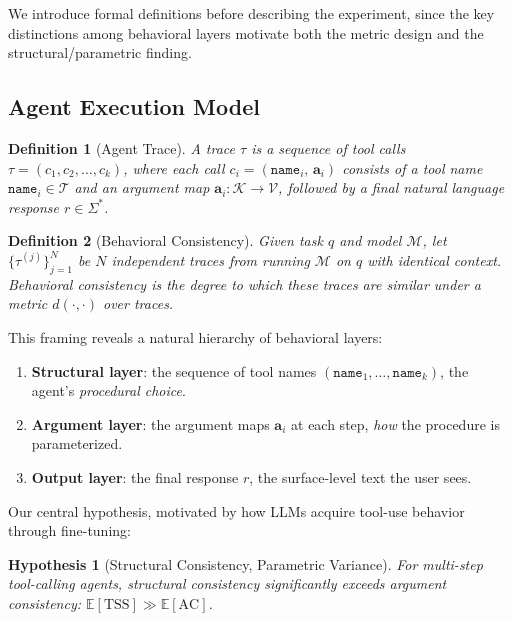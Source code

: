 \documentclass[letterpaper]{article}
\newtheorem{definition}{Definition}
\newtheorem{hypothesis}{Hypothesis}
\newcommand{\tss}{\mathrm{TSS}}
\newcommand{\ac}{\mathrm{AC}}
\begin{document}
We introduce formal definitions before describing the experiment, since the key
distinctions among behavioral layers motivate both the metric design and the
structural/parametric finding.

\subsection{Agent Execution Model}

\begin{definition}[Agent Trace]
A \emph{trace} $\tau$ is a sequence of tool calls
$\tau = (c_1, c_2, \ldots, c_k)$, where each call
$c_i = (\mathtt{name}_i,\, \mathbf{a}_i)$ consists of a tool name
$\mathtt{name}_i \in \mathcal{T}$ and an argument map
$\mathbf{a}_i : \mathcal{K} \to \mathcal{V}$, followed by a final natural
language response $r \in \Sigma^*$.
\end{definition}

\begin{definition}[Behavioral Consistency]
Given task $q$ and model $\mathcal{M}$, let $\{\tau^{(j)}\}_{j=1}^N$ be $N$
independent traces from running $\mathcal{M}$ on $q$ with identical context.
\emph{Behavioral consistency} is the degree to which these traces are similar
under a metric $d(\cdot, \cdot)$ over traces.
\end{definition}

This framing reveals a natural hierarchy of behavioral layers:
\begin{enumerate}[leftmargin=1.5em]
  \item \textbf{Structural layer}: the sequence of tool names
    $(\mathtt{name}_1, \ldots, \mathtt{name}_k)$, the agent's \emph{procedural
    choice}.
  \item \textbf{Argument layer}: the argument maps $\mathbf{a}_i$ at each
    step, \emph{how} the procedure is parameterized.
  \item \textbf{Output layer}: the final response $r$, the surface-level text
    the user sees.
\end{enumerate}

\noindent Our central hypothesis, motivated by how LLMs acquire tool-use behavior
through fine-tuning:

\begin{hypothesis}[Structural Consistency, Parametric Variance]\label{hyp:main}
For multi-step tool-calling agents, structural consistency significantly exceeds
argument consistency: $\mathbb{E}[\tss] \gg \mathbb{E}[\ac]$.
\end{hypothesis}
\end{document}
